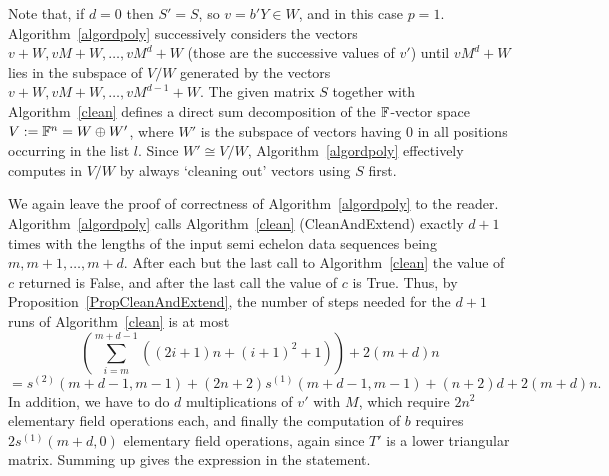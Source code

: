 \begin{Rem}
Note that, if $d=0$ then $S'=S$, so $v=b'Y\in W$, and in this case $p=1$. 
Algorithm~\ref{algordpoly} successively considers the vectors $v+W,
vM+W, \ldots, vM^d+W$  (those are the successive values of
$v'$) until $vM^d+W$ lies in the subspace of $V/W$ 
generated by the vectors $v+W, vM+W, \ldots, vM^{d-1}+W$. 
The given matrix $S$ together with Algorithm~\ref{clean} defines a
direct sum decomposition of the $\mathbb{F}$-vector space $V := \mathbb{F}^n = W \oplus
W'$,
where $W'$ is the subspace of vectors having $0$ in all positions
occurring in the list $l$. Since $W' \cong V/W$, 
Algorithm~\ref{algordpoly} effectively computes in $V/W$ by always `cleaning
out' vectors using $S$ first. 
\end{Rem}

We again leave the proof of correctness of Algorithm~\ref{algordpoly}
to the reader.
Algorithm~\ref{algordpoly} calls Algorithm~\ref{clean} ({\sc CleanAnd\-Extend}) exactly
$d+1$ times with the lengths of the input semi echelon data
sequences being $m,m+1, \ldots, m+d$. After each but the last call to
Algorithm~\ref{clean} the value of 
$c$ returned is {\sc False}, and after the last call the value of $c$ 
is {\sc True}. Thus, by
Proposition~\ref{PropCleanAndExtend}, the number of steps needed 
for the $d+1$ runs of Algorithm~\ref{clean} is at most
\[
\left(\sum_{i=m}^{m+d-1} ((2i+1)n+(i+1)^2+1)\right)  +  2(m+d)n  \]
\[
   = s^{(2)}(m+d-1,m-1) + (2n+2)s^{(1)}(m+d-1,m-1) + (n+2)d +2(m+d)n.
\]
In addition, we have to do $d$ multiplications of $v'$ with $M$, which require
$2n^2$ elementary field operations each, and finally the computation of $b$
requires $2s^{(1)}(m+d,0)$ elementary field operations, again since 
$T'$ is a lower triangular matrix. Summing up gives the expression in 
the statement. 
\proofend

